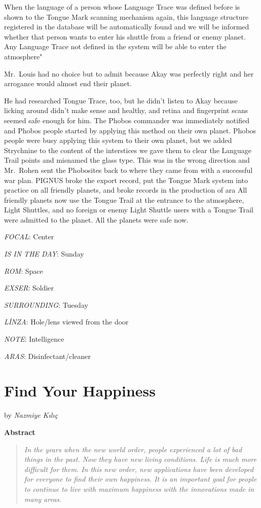 \documentclass[]{book}
\begin{document}
When the language of a person whose Language Trace was defined before is shown to the Tongue Mark scanning mechanism again, this language structure registered in the database will be automatically found and we will be informed whether that person wants to enter his shuttle from a friend or enemy planet. Any Language Trace not defined in the system will be able to enter the atmosphere"

Mr.~Louis had no choice but to admit because Akay was perfectly right and her arrogance would almost end their planet.

He had researched Tongue Trace, too, but he didn't listen to Akay because licking around didn't make sense and healthy, and retina and fingerprint scans seemed safe enough for him. The Phobos commander was immediately notified and Phobos people started by applying this method on their own planet. Phobos people were busy applying this system to their own planet, but we added Strychnine to the content of the interstices we gave them to clear the Language Trail points and misnamed the glass type. This was in the wrong direction and Mr.~Rohen sent the Phobosites back to where they came from with a successful war plan. PIGNUS broke the export record, put the Tongue Mark system into practice on all friendly planets, and broke records in the production of ara All friendly planets now use the Tongue Trail at the entrance to the atmosphere, Light Shuttles, and no foreign or enemy Light Shuttle users with a Tongue Trail were admitted to the planet. All the planets were safe now.

\emph{FOCAL}: Center

\emph{IS IN THE DAY}: Sunday

\emph{ROM}: Space

\emph{EXSER}: Soldier

\emph{SURROUNDING}: Tuesday

\emph{LİNZA}: Hole/lens viewed from the door

\emph{NOTE}: Intelligence

\emph{ARAS}: Disinfectant/cleaner

\hypertarget{find-your-happiness}{%
\chapter{Find Your Happiness}\label{find-your-happiness}}

by \emph{Nazmiye Kılıç}

\textbf{Abstract}

\begin{quote}
\emph{In the years when the new world order, people experienced a lot of bad things in the past. Now they have new living conditions. Life is much more difficult for them. In this new order, new applications have been developed for everyone to find their own happiness. It is an important goal for people to continue to live with maximum happiness with the innovations made in many areas.}
\end{quote}
\end{document}
